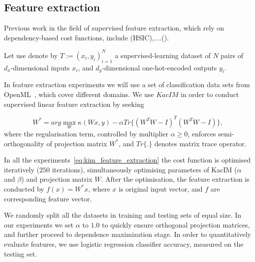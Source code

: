 \documentclass{article}
\begin{document}
\subsection{Feature extraction}

Previous work in the field of supervised feature extraction, which rely on dependency-based cost functions, include \cite{EigenHSIC,HSCA,10.1145/1839490.1839495} (HSIC),....().



Let use denote by $T := (x_{i},y_{i})_{i=1}^{N}$ a supervised-learning dataset of $N$ pairs of $d_{x}$-dimensional inputs $x_{i}$, and $d_{y}$-dimensional one-hot-encoded outputs $y_{i}$.

In feature extraction experiments we will use a set of classification data sets from OpenML~\cite{OpenML2013}, which cover different domains.  We use $KacIM$ in order to conduct supervised linear feature extraction by seeking 

\begin{equation}
\label{eq:kim_feature_extraction}    
W^{*} = arg \max_{W} \kappa(Wx, y) - \alpha Tr\{(W^{T}W-I)^{T}(W^{T}W-I) \},
\end{equation}
where the regularisation term, controlled by multiplier $\alpha \geq 0$, enforces semi-orthogonality of projection matrix $W^{*}$, and $Tr\{.\}$ denotes matrix trace operator.


In all the experiments~\eqref{eq:kim_feature_extraction} the cost function is optimised iteratively ($250$ iterations), simultaneously optimising parameters of KacIM ($\alpha$ and $\beta$) and projection matrix $W$.
After the optimisation, the feature extraction is conducted by $f(x) = W^{*}x$, where $x$ is original input vector, and $f$ are corresponding feature vector. 



We randomly split all the datasets in training and testing sets of equal size. %
In our experiments we set $\alpha$ to $1.0$ to quickly ensure orthogonal projection matrices, and further proceed to dependence maximization stage. In order to quantitatively evaluate features, we use logistic regression classifier accuracy, measured on the testing set.
\end{document}
